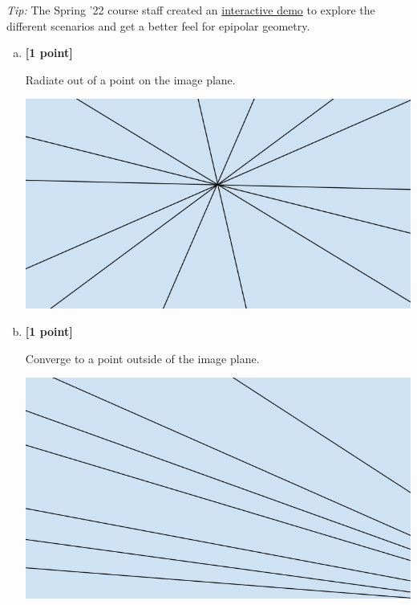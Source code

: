 \textit{Tip:} The Spring '22 course staff created an \href{https://browncsci1430.github.io/webpage/demos/stereo_camera_visualization/index.html}{interactive demo} to explore the different scenarios and get a better feel for epipolar geometry.

\begin{enumerate}[(a)]
\item \textbf{[1 point]} 
\begin{tcolorbox}[colback=orange!5!white,colframe=orange!75!black]
Radiate out of a point on the image plane.
\end{tcolorbox}

\includegraphics[width = 0.5\linewidth]{images/epipolarlines-a.PNG}

\item \textbf{[1 point]}
\begin{tcolorbox}[colback=orange!5!white,colframe=orange!75!black]
Converge to a point outside of the image plane.
\end{tcolorbox}

\includegraphics[width = 0.5\linewidth]{images/epipolarlines-b.PNG}

\end{enumerate}
